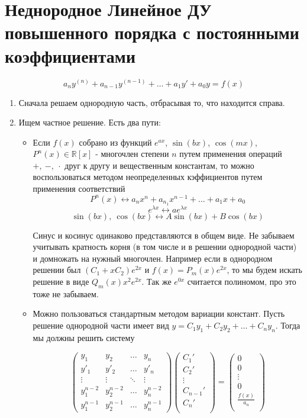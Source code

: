\documentclass[11pt]{article}
\begin{document}
	\section{Неднородное Линейное ДУ повышенного порядка с постоянными коэффициентами}
	$$a_{n} y^{(n)} +a_{n-1} y^{(n-1)} + \dots + a_{1} y' + a_{0} y = f(x) $$
	\begin{enumerate}
		\item Сначала решаем однородную часть, отбрасывая то, что находится справа.
		\item Ищем частное решение. Есть два пути:
			\begin{itemize}
				\item Если $f(x)$ собрано из функций $e^{ax}$, $\sin(bx)$, $\cos(mx)$, $P^n (x) \in \mathbb{R}[x]$ - многочлен степени $n$ путем применения операций $+,\ -,\ \cdot$ друг к другу и вещественным константам, то можно воспользоваться методом неопределенных кэффициентов путем применения соответствий
				$$P^n (x) \leftrightarrow a_n x^n + a_{n_1} x^{n-1} + \dots + a_1 x + a_0$$
				$$e^{\lambda x} \leftrightarrow ae^{\lambda x}$$
				$$\sin(bx),\ \cos (bx) \leftrightarrow A\sin(bx) + B\cos(bx)$$
				
				Синус и косинус одинаково представляются в общем виде. Не забываем учитывать кратность корня (в том числе и в решении однородной части) и домножать на нужный многочлен. 
				Например если в однородном решении был $(C_1 + xC_2)e^{2x}$ и $f(x) = P_m(x)e^{2x}$, то мы будем искать решение в виде $Q_m(x)x^2e^{2x}$. Так же $e^{0x}$ считается полиномом, про это тоже не забываем.
				\item Можно пользоваться стандартным методом вариации констант. Пусть решение однородной части имеет вид $y = C_1 y_1 +C_2 y_2 +\dots + C_n y_n$. Тогда мы должны решить систему
				
				$$\begin{pmatrix}
				y_1 & y_2 & \dots & y_n\\
				y'_1 & y'_2 & \dots & y'_n\\
				\vdots & \vdots & \ddots & \vdots\\
				y_1^{n-2} & y_2^{n-2} & \dots & y_n^{n-2}\\
				y_1^{n-1} & y_2^{n-1} & \dots & y_n^{n-1}
				\end{pmatrix}
				\begin{pmatrix}
				C_1'\\
				C_2'\\
				\vdots\\
				C_{n-1}'\\
				C_n'\\
				\end{pmatrix}=
				\begin{pmatrix}
				0\\
				0\\
				\vdots\\
				0\\
				\frac{f(x)}{a_n}\\
				\end{pmatrix}
				$$
				

\end{itemize}
\end{enumerate}
\end{document}
